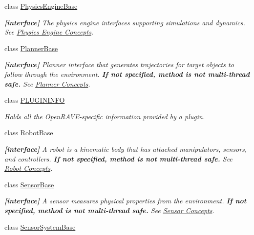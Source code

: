 \begin{DoxyCompactItemize}
class \hyperlink{classOpenRAVE_1_1PhysicsEngineBase}{PhysicsEngineBase}
\begin{DoxyCompactList}\small\item\em {\bfseries \mbox{[}interface\mbox{]}} The physics engine interfaces supporting simulations and dynamics. See \hyperlink{arch__physicsengine}{Physics Engine Concepts}. \item\end{DoxyCompactList}\item 
class \hyperlink{classOpenRAVE_1_1PlannerBase}{PlannerBase}
\begin{DoxyCompactList}\small\item\em {\bfseries \mbox{[}interface\mbox{]}} Planner interface that generates trajectories for target objects to follow through the environment. {\bfseries If not specified, method is not multi-\/thread safe.} See \hyperlink{arch__planner}{Planner Concepts}. \item\end{DoxyCompactList}\item 
class \hyperlink{classOpenRAVE_1_1PLUGININFO}{PLUGININFO}
\begin{DoxyCompactList}\small\item\em Holds all the OpenRAVE-\/specific information provided by a plugin. \item\end{DoxyCompactList}\item 
class \hyperlink{classOpenRAVE_1_1RobotBase}{RobotBase}
\begin{DoxyCompactList}\small\item\em {\bfseries \mbox{[}interface\mbox{]}} A robot is a kinematic body that has attached manipulators, sensors, and controllers. {\bfseries If not specified, method is not multi-\/thread safe.} See \hyperlink{arch__robot}{Robot Concepts}. \item\end{DoxyCompactList}\item 
class \hyperlink{classOpenRAVE_1_1SensorBase}{SensorBase}
\begin{DoxyCompactList}\small\item\em {\bfseries \mbox{[}interface\mbox{]}} A sensor measures physical properties from the environment. {\bfseries If not specified, method is not multi-\/thread safe.} See \hyperlink{arch__sensor}{Sensor Concepts}. \item\end{DoxyCompactList}\item 
class \hyperlink{classOpenRAVE_1_1SensorSystemBase}{SensorSystemBase}

\end{DoxyCompactItemize}
